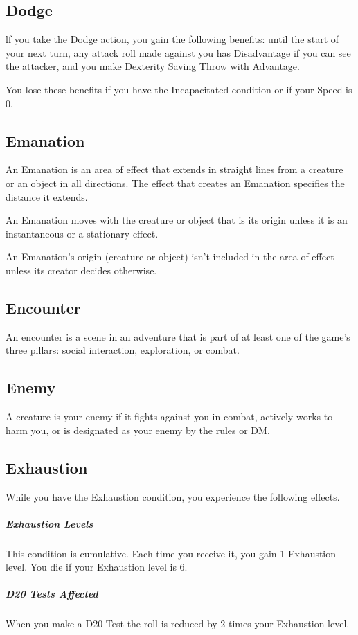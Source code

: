 \documentclass[10pt,a4paper,twoside,bg=print,twocolumn,openany,nodeprecatedcode]{dndarticle}
\begin{document}
\subsection{Dodge}
lf you take the Dodge action, you gain the following benefits: until the start of your next turn, any attack roll made against you has Disadvantage if you can see the attacker, and you make Dexterity Saving Throw with Advantage.

You lose these benefits if you have the Incapacitated condition or if your Speed is 0.

\subsection{Emanation}
An Emanation is an area of effect that extends in straight lines from a creature or an object in all directions. The effect that creates an Emanation specifies the distance it extends.

An Emanation moves with the creature or object that is its origin unless it is an instantaneous or a stationary effect.

An Emanation's origin (creature or object) isn't included in the area of effect unless its creator decides otherwise.

\subsection{Encounter}
An encounter is a scene in an adventure that is part of at least one of the game's three pillars: social interaction, exploration, or combat.

\subsection{Enemy}
A creature is your enemy if it fights against you in combat, actively works to harm you, or is designated as your enemy by the rules or DM.

\subsection{Exhaustion}
While you have the Exhaustion condition, you experience the following effects.

\subparagraph{Exhaustion Levels}
This condition is cumulative. Each time you receive it, you gain 1 Exhaustion level. You die if your Exhaustion level is 6.

\subparagraph{D20 Tests Affected}
When you make a D20 Test the roll is reduced by 2 times your Exhaustion level.
\end{document}
